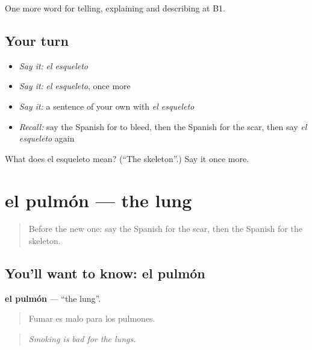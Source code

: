 \begin{grammarlens}[title={What you've built}]
One more word for telling, explaining and describing at B1.
\end{grammarlens}

\subsection*{Your turn}
\begin{itemize}
\raggedright
  \item \emph{Say it:} \emph{el esqueleto}
  \item \emph{Say it:} \emph{el esqueleto}, once more
  \item \emph{Say it:} a sentence of your own with \emph{el esqueleto}
  \item \emph{Recall:} say the Spanish for to bleed, then the Spanish for the scar, then say \emph{el esqueleto} again
\end{itemize}

\begin{tcolorbox}[breakable,colback=teal!4,colframe=teal!35!black,title={Before you move on}]
What does el esqueleto mean? (\textquotedblleft{}The skeleton\textquotedblright{}.) Say it once more.
\end{tcolorbox}
\section[el pulmón]{el pulmón — the lung}

\label{lesson:ES-C735-pulmon}



\begin{quote}
Before the new one: say the Spanish for the scar, then the Spanish for the skeleton.
\end{quote}

\subsection*{You'll want to know: el pulmón}
\textbf{el pulmón} — \textquotedblleft{}the lung\textquotedblright{}.

\begin{quote}
Fumar es malo para los pulmones.
\end{quote}

\begin{quote}
\emph{Smoking is bad for the lungs.}
\end{quote}

